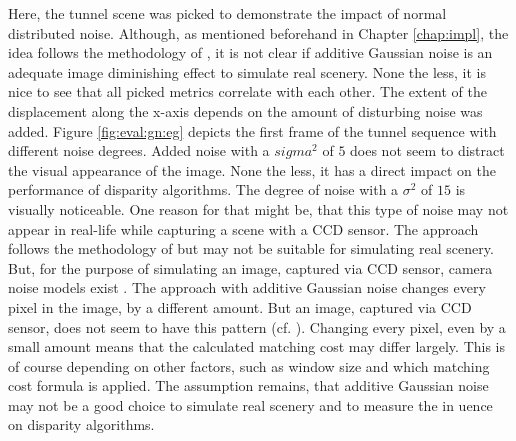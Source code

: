 \noindent Here, the tunnel scene was picked to demonstrate the impact of normal distributed noise.
Although, as mentioned beforehand in Chapter \ref{chap:impl}, the idea follows the methodology of \citeauthor{richardt2010real} \citep{richardt2010real}, it is not clear if additive Gaussian noise is an adequate image diminishing effect to simulate real scenery.
None the less, it is nice to see that all picked metrics correlate with each other.
The extent of the displacement along the x-axis depends on the amount of disturbing noise was added.
Figure \ref{fig:eval:gn:eg} depicts the first frame of the tunnel sequence with different noise degrees.
Added noise with a $sigma^2$ of $5$ does not seem to distract the visual appearance of the image.
None the less, it has a direct impact on the performance of disparity algorithms.
The degree of noise with a $\sigma^2$ of $15$ is visually noticeable.
One reason for that might be, that this type of noise may not appear in real-life while capturing a scene with a CCD sensor.
The approach follows the methodology of \citeauthor{richardt2010real} \citep{richardt2010real} but may not be suitable for simulating real scenery.
But, for the purpose of simulating an image, captured via CCD sensor, camera noise models exist \citep{liu2006noise}.
The approach with additive Gaussian noise changes every pixel in the image, by a different amount.
But an image, captured via CCD sensor, does not seem to have this pattern (cf. \citep{liu2006noise}).
Changing every pixel, even by a small amount means that the calculated matching cost may differ largely.
This is of course depending on other factors, such as window size and which matching cost formula is applied.
The assumption remains, that additive Gaussian noise may not be a good choice to simulate real scenery and to measure the in uence on disparity algorithms.

